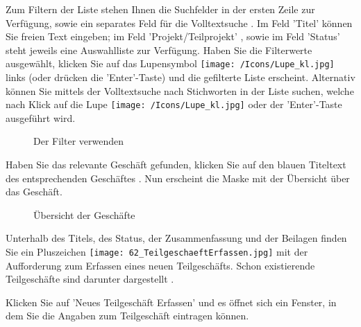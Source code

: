Zum Filtern der Liste stehen Ihnen die Suchfelder in der ersten Zeile zur Verfügung, sowie ein separates Feld für die Volltextsuche . Im Feld 'Titel'  können Sie freien Text eingeben; im Feld 'Projekt/Teilprojekt' , sowie im Feld 'Status'  steht jeweils eine Auswahlliste zur Verfügung. Haben Sie die Filterwerte ausgewählt, klicken Sie auf das Lupensymbol \texttt{[image: /Icons/Lupe\_kl.jpg]}  links (oder drücken die 'Enter'-Taste) und die gefilterte Liste erscheint. Alternativ können Sie mittels der Volltextsuche nach Stichworten in der Liste suchen, welche nach Klick auf die Lupe \texttt{[image: /Icons/Lupe\_kl.jpg]}  oder der 'Enter'-Taste ausgeführt wird.

\begin{figure}[H]
\caption{Der Filter verwenden}
\end{figure}


Haben Sie das relevante Geschäft gefunden, klicken Sie auf den blauen Titeltext des entsprechenden Geschäftes . Nun erscheint die Maske mit der Übersicht über das Geschäft.

\begin{figure}[H]
\caption{Übersicht der Geschäfte}
\end{figure}

Unterhalb des Titels, des Status, der Zusammenfassung und der Beilagen finden Sie ein Pluszeichen \texttt{[image: 62\_TeilgeschaeftErfassen.jpg]}  mit der Aufforderung zum Erfassen eines neuen Teilgeschäfts. Schon existierende Teilgeschäfte sind darunter dargestellt .

\vspace{\baselineskip}

Klicken Sie auf 'Neues Teilgeschäft Erfassen' und es öffnet sich ein Fenster, in dem Sie die Angaben zum Teilgeschäft eintragen können.

